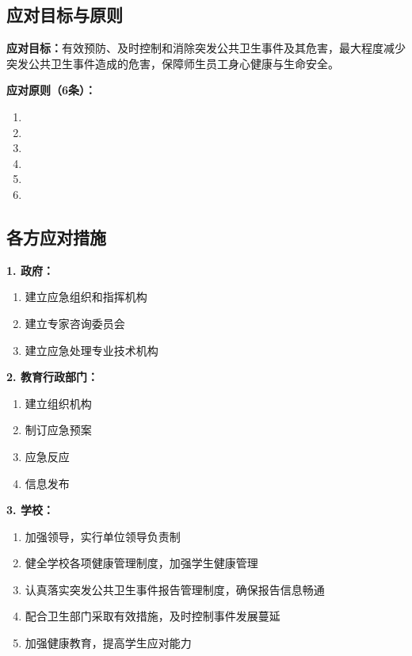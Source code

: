 \subsection{应对目标与原则}

\begin{keybox}
\textbf{应对目标：}有效预防、及时控制和消除突发公共卫生事件及其危害，最大程度减少突发公共卫生事件造成的危害，保障师生员工身心健康与生命安全。

\textbf{应对原则（6条）：}

\begin{enumerate}[leftmargin=*]
    \item {}
    \item {}
    \item {}
    \item {}
    \item {}
    \item {}
\end{enumerate}
\end{keybox}

\subsection{各方应对措施}

\begin{keybox}
\textbf{1. 政府：}
\begin{enumerate}[leftmargin=*]
    \item 建立应急组织和指挥机构
    \item 建立专家咨询委员会
    \item 建立应急处理专业技术机构
\end{enumerate}

\textbf{2. 教育行政部门：}
\begin{enumerate}[leftmargin=*]
    \item 建立组织机构
    \item 制订应急预案
    \item 应急反应
    \item 信息发布
\end{enumerate}

\textbf{3. 学校：}
\begin{enumerate}[leftmargin=*]
    \item 加强领导，实行单位领导负责制
    \item 健全学校各项健康管理制度，加强学生健康管理
    \item 认真落实突发公共卫生事件报告管理制度，确保报告信息畅通
    \item 配合卫生部门采取有效措施，及时控制事件发展蔓延
    \item 加强健康教育，提高学生应对能力
\end{enumerate}
\end{keybox}

